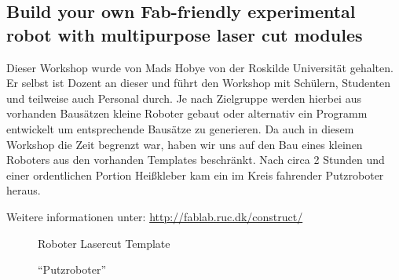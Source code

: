 \documentclass{\basedir/fablab-document}
\begin{document}
\subsection*{Build your own Fab-friendly experimental robot with multipurpose laser cut modules}

Dieser Workshop wurde von Mads Hobye von der Roskilde Universität
gehalten. Er selbst ist Dozent an dieser und führt den Workshop mit
Schülern, Studenten und teilweise auch Personal durch. Je nach
Zielgruppe werden hierbei aus vorhanden Bausätzen kleine Roboter gebaut
oder alternativ ein Programm entwickelt um entsprechende Bausätze zu
generieren. Da auch in diesem Workshop die Zeit begrenzt war, haben wir
uns auf den Bau eines kleinen Roboters aus den vorhanden Templates
beschränkt. Nach circa 2 Stunden und einer ordentlichen Portion
Heißkleber kam ein im Kreis fahrender Putzroboter heraus.

Weitere informationen unter: \url{http://fablab.ruc.dk/construct/}

\begin{figure}[h]
	\noindent{}
	\caption{Roboter Lasercut Template}
	\label{roboterbausatz}
\end{figure}
\begin{figure}[h]
	\noindent{}
	\caption{``Putzroboter''}
	\label{putzroboter}
\end{figure}
\end{document}
